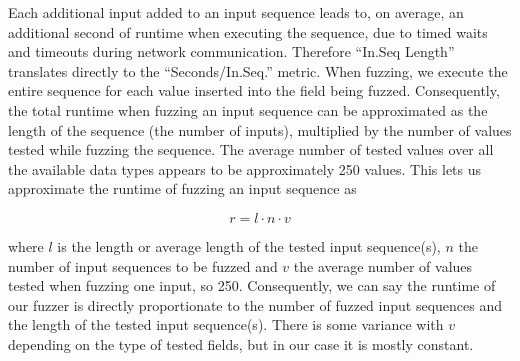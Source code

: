 Each additional input added to an input sequence leads to, on average, an additional second of runtime when executing the sequence, due to timed waits and timeouts during network communication. Therefore ``In.Seq Length'' translates directly to the  ``Seconds/In.Seq.'' metric. When fuzzing, we execute the entire sequence for each value inserted into the field being fuzzed. Consequently, the total runtime when fuzzing an input sequence can be approximated as the length of the sequence (the number of inputs), multiplied by the number of values tested while fuzzing the sequence. The average number of tested values over all the available data types appears to be approximately 250 values. This lets us approximate the runtime of fuzzing an input sequence as

\begin{equation}
	r = l \cdot n \cdot v
\end{equation}

where $l$ is the length or average length of the tested input sequence(s), $n$ the number of input sequences to be fuzzed and $v$ the average number of values tested when fuzzing one input, so 250. Consequently, we can say the runtime of our fuzzer is directly proportionate to the number of fuzzed input sequences and the length of the tested input sequence(s). There is some variance with $v$ depending on the type of tested fields, but in our case it is mostly constant.